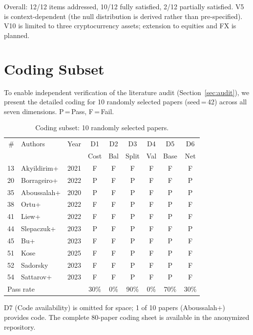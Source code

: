 \documentclass[sigconf,anonymous,review]{acmart}
\begin{document}
Overall: 12/12 items addressed, 10/12 fully satisfied, 2/12 partially
satisfied. V5 is context-dependent (the null distribution is
derived rather than pre-specified). V10 is limited to three
cryptocurrency assets; extension to equities and FX is planned.

\section{Coding Subset}
\label{app:coding}

To enable independent verification of the literature audit
(Section~\ref{sec:audit}), we present the detailed coding for 10
randomly selected papers (seed\,=\,42) across all seven dimensions.
P\,=\,Pass, F\,=\,Fail.

\begin{table}[h]
\centering
\caption{Coding subset: 10 randomly selected papers.}
\label{tab:coding}
\footnotesize
\setlength{\tabcolsep}{2.5pt}
\begin{tabular}{rlccccccc}
\toprule
\# & Authors & Year & D1 & D2 & D3 & D4 & D5 & D6 \\
   &         &      & Cost & Bal & Split & Val & Base & Net \\
\midrule
13 & Akyildirim+ & 2021 & F & F & F & F & F & F \\
20 & Borrageiro+ & 2022 & P & F & P & F & F & P \\
35 & Aboussalah+ & 2020 & P & F & P & F & P & P \\
38 & Ortu+ & 2022 & F & F & P & F & P & F \\
41 & Liew+ & 2022 & F & F & P & F & P & F \\
44 & Slepaczuk+ & 2023 & P & F & P & F & F & P \\
45 & Bu+ & 2023 & F & F & P & F & P & F \\
51 & Kose & 2025 & F & F & P & F & P & F \\
52 & Sadorsky & 2023 & F & F & P & F & P & F \\
54 & Sattarov+ & 2023 & F & F & P & F & P & F \\
\midrule
\multicolumn{3}{l}{Pass rate} & 30\% & 0\% & 90\% & 0\% & 70\% & 30\% \\
\bottomrule
\end{tabular}
\end{table}

D7 (Code availability) is omitted for space; 1 of 10 papers (Aboussalah+) provides code.
The complete 80-paper coding sheet is available in the anonymized repository.
\end{document}
